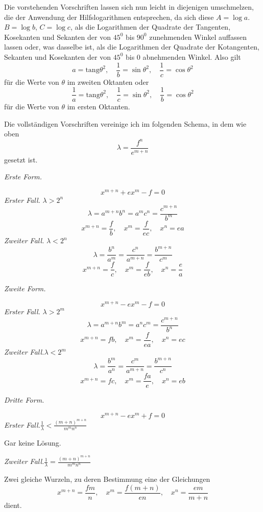 Die vorstehenden Vorschriften lassen sich nun leicht in diejenigen umschmelzen, die der Anwendung der Hilfslogarithmen entsprechen, da sich diese $A=\log a$.
$B=\log b$, $C=\log c$, als die Logarithmen der Quadrate der Tangenten, Kosekanten und Sekanten der von $45^0$ bis $90^0$ zunehmenden Winkel auffassen lassen oder, was dasselbe ist, als die Logarithmen der Quadrate der Kotangenten,
Sekanten und Kosekanten der von $45^0$ bis $0$ abnehmenden Winkel. Also gilt
\[
a=\mathrm{tang}\theta^2,\quad \frac{1}{b}=\sin\theta^2,\quad
\frac{1}{c}=\cos\theta^2
\]
für die Werte von $\theta$ im zweiten Oktanten oder
\[
\frac{1}{a}=\mathrm{tang}\theta^2,\quad
\frac{1}{c}=\sin\theta^2,\quad
\frac{1}{b}=\cos\theta^2
\]
für die Werte von $\theta$ im ersten Oktanten.

Die vollständigen Vorschriften vereinige ich im folgenden Schema, in dem wie oben
\[
\lambda=\frac{f^n}{e^{m+n}}
\]
gesetzt ist.

\begin{center}\textit{Erste Form.}\end{center}
\[
x^{m+n}+ex^m-f=0
\]
\textit{Erster Fall.} $\lambda>2^n$
\[
\lambda=a^{m+n}b^n=a^m c^n=\frac{c^{m+n}}{b^m}
\]
\[
x^{m+n}=\frac{f}{b},\quad x^m=\frac{f}{ec},\quad x^n=ea
\]
\textit{Zweiter Fall.} $\lambda<2^n$
\[
\lambda=\frac{b^n}{a^m}=\frac{c^n}{a^{m+n}}=\frac{b^{m+n}}{c^m}
\]
\[
x^{m+n}=\frac{f}{c},\quad x^m=\frac{f}{eb},\quad x^n=\frac{e}{a}
\]

\begin{center}\textit{Zweite Form.}\end{center}
\[
x^{m+n}-ex^m-f=0
\]
\textit{Erster Fall.} $\lambda>2^m$
\[
\lambda=a^{m+n}b^m=a^nc^m=\frac{c^{m+n}}{b^n}
\]
\[
x^{m+n}=fb,\quad x^m=\frac{f}{ea},\quad x^n=ec
\]
\textit{Zweiter Fall.}\quad $\lambda<2^m$
\[
\lambda=\frac{b^m}{a^n}=\frac{c^m}{a^{m+n}}=\frac{b^{m+n}}{c^n}
\]
\[
x^{m+n}=fc,\quad x^m=\frac{fa}{e},\quad x^n=eb
\]
\begin{center}\textit{Dritte Form.}\end{center}
\[
x^{m+n}-ex^m+f=0
\]
\textit{Erster Fall.}\quad $\frac{1}{\lambda}<\frac{(m+n)^{m+n}}{m^mn^n}$

Gar keine Lösung.

\textit{Zweiter Fall.}\quad $\frac{1}{\lambda}=\frac{(m+n)^{m+n}}{m^mn^n}$

Zwei gleiche Wurzeln, zu deren Bestimmung eine der Gleichungen
\[
x^{m+n}=\frac{fm}{n},\quad x^m=\frac{f(m+n)}{en},\quad x^n=\frac{em}{m+n}
\]
dient.

